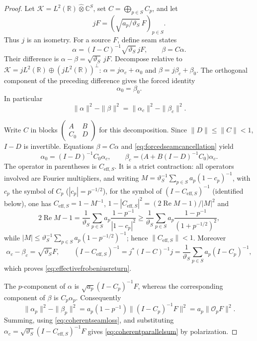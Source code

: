 \documentclass[11pt]{amsart}
\theoremstyle{definition}
\theoremstyle{remark}
\begin{document}
\begin{proof}
Let
\(
 \mathcal K=L^2(\mathbb R)\widehat\otimes\mathbb C^S
\), set \(C=\bigoplus_{p\in S}C_p\), and let
\[
 jF=\left(\sqrt{a_p/\vartheta_S}\,F\right)_{p\in S}.
\]
Thus $j$ is an isometry.  For a source $F$, define seam states
\[
 \alpha=(I-C)^{-1}\sqrt{\vartheta_S}\,jF,
 \qquad \beta=C\alpha.
\]
Their difference is
\(
 \alpha-\beta=\sqrt{\vartheta_S}\,jF
\).
Decompose relative to
\(
 \mathcal K=jL^2(\mathbb R)\oplus(jL^2(\mathbb R))^\perp
\):
\(
 \alpha=j\alpha_c+\alpha_0
\) and
\(
 \beta=j\beta_c+\beta_0
\).
The orthogonal component of the preceding difference gives the forced
identity
\begin{equation}\label{eq:forcedseamcancellation}
 \alpha_0=\beta_0.
\end{equation}
In particular
\begin{equation}\label{eq:coherentseamloss}
 \|\alpha\|^2-\|\beta\|^2
 =\|\alpha_c\|^2-\|\beta_c\|^2.
\end{equation}

Write $C$ in blocks
\(
 \left(\begin{smallmatrix}A&B\\ C_0&D\end{smallmatrix}\right)
\)
for this decomposition.  Since $\|D\|\le\|C\|<1$,
$I-D$ is invertible.  Equations $\beta=C\alpha$ and
\eqref{eq:forcedseamcancellation} yield
\[
 \alpha_0=(I-D)^{-1}C_0\alpha_c,
 \qquad
 \beta_c=\bigl(A+B(I-D)^{-1}C_0\bigr)\alpha_c.
\]
The operator in parentheses is $C_{\mathrm{eff},S}$.  It is a strict
contraction: all operators involved are Fourier multipliers, and writing
$M=\vartheta_S^{-1}\sum_{p\in S}a_p(1-c_p)^{-1}$, with $c_p$ the symbol of
$C_p$ ($|c_p|=p^{-1/2}$), for the symbol of $(I-C_{\mathrm{eff},S})^{-1}$
(identified below), one has $C_{\mathrm{eff},S}=1-M^{-1}$,
$1-|C_{\mathrm{eff},S}|^2=(2\operatorname{Re}M-1)/|M|^2$ and
\[
 2\operatorname{Re}M-1
 =\frac1{\vartheta_S}\sum_{p\in S}a_p\frac{1-p^{-1}}{|1-c_p|^2}
 \ge\frac1{\vartheta_S}\sum_{p\in S}a_p\frac{1-p^{-1}}{(1+p^{-1/2})^2},
\]
while $|M|\le\vartheta_S^{-1}\sum_{p\in S}a_p(1-p^{-1/2})^{-1}$; hence
$\|C_{\mathrm{eff},S}\|<1$.  Moreover
\[
 \alpha_c-\beta_c=\sqrt{\vartheta_S}F,
 \qquad
 (I-C_{\mathrm{eff},S})^{-1}
 =j^*(I-C)^{-1}j
 =\frac{1}{\vartheta_S}\sum_{p\in S}a_p(I-C_p)^{-1},
\]
which proves \eqref{eq:effectivefrobeniusreturn}.

The $p$-component of $\alpha$ is
\(
 \sqrt{a_p}(I-C_p)^{-1}F
\), whereas the corresponding component of $\beta$ is $C_p\alpha_p$.
Consequently
\[
 \|\alpha_p\|^2-\|\beta_p\|^2
 =a_p(1-p^{-1})\|(I-C_p)^{-1}F\|^2
 =a_p\|\mathcal O_pF\|^2.
\]
Summing, using \eqref{eq:coherentseamloss}, and substituting
\(
 \alpha_c=\sqrt{\vartheta_S}
 (I-C_{\mathrm{eff},S})^{-1}F
\)
gives \eqref{eq:coherentparallelsum} by polarization.
\end{proof}
\end{document}
